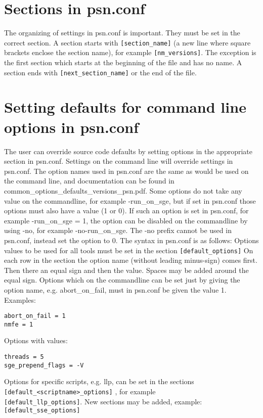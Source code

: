 \section{Sections in psn.conf}
The organizing of settings in psn.conf is important. They must be set in the correct section. A section starts with
\verb|[section_name]| 
(a new line where square brackets enclose the section name), for example
\verb|[nm_versions]|.
The exception is the first section which starts at the beginning of the file and has no name.
A section ends with 
\verb|[next_section_name]|
or the end of the file.

\section{Setting defaults for command line options in psn.conf}

The user can override source code defaults by setting options in the appropriate section in psn.conf. Settings on the command line will override settings in psn.conf. The option names used in psn.conf are the same as would be used on the command line, and documentation can be found in common\_options\_defaults\_versions\_psn.pdf. Some options do not take any value on the commandline, for example -run\_on\_sge, but if set in psn.conf those options must also have a value (1 or 0). If such an option is set in psn.conf, for example
-run\_on\_sge = 1, the option can be disabled on the commandline by using -no, for example 
-no-run\_on\_sge. The -no prefix cannot be used in psn.conf, instead set the option to 0.
The syntax in psn.conf is as follows: Options values to be used for all tools must be set in the section \verb|[default_options]| 
On each row in the section the option name (without leading minus-sign) comes first. Then there an equal sign and then the value. Spaces may be added around the equal sign. Options which on the commandline can be set just by giving the option name, e.g. abort\_on\_fail, must in psn.conf be given the value 1. Examples:
\begin{verbatim}
abort_on_fail = 1
nmfe = 1
\end{verbatim}
Options with values:
\begin{verbatim}
threads = 5
sge_prepend_flags = -V 
\end{verbatim}
Options for specific scripts, e.g. llp, can be set in the sections\\
\verb|[default_<scriptname>_options]| , for example\\
 \verb|[default_llp_options]|. New sections may be added, example:\\
\verb|[default_sse_options]|

